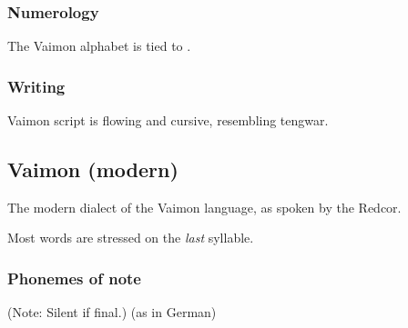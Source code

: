 




\subsubsection{Numerology}
The Vaimon alphabet is tied to . 





\subsubsection{Writing}
Vaimon script is flowing and cursive, resembling tengwar. 









\subsection{Vaimon (modern)}
The modern dialect of the Vaimon language, as spoken by the Redcor. 

Most words are stressed on the \emph{last} syllable. 





\begin{pronunciationenvironment}{\subsubsection{Phonemes of note}}
   (Note: Silent if final.)
   (as in German)
\end{pronunciationenvironment}














